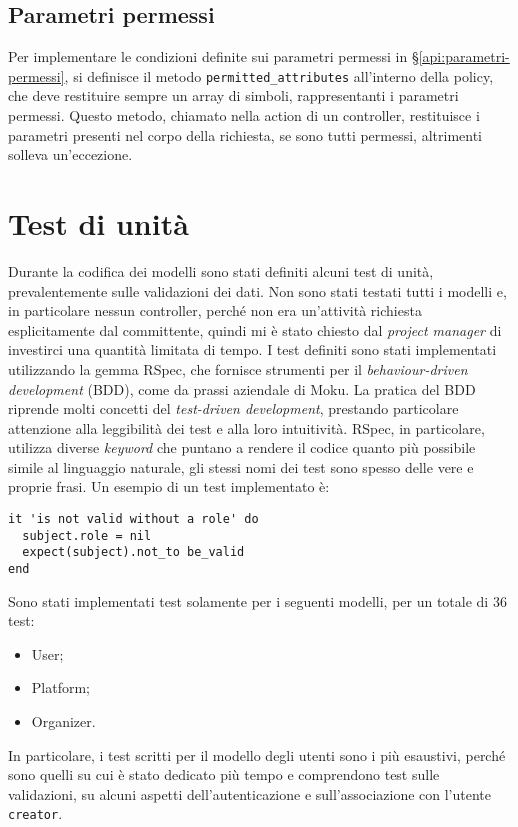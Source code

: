 \subsection{Parametri permessi}
Per implementare le condizioni definite sui parametri permessi in \S \ref{api:parametri-permessi}, si definisce il metodo \verb|permitted_attributes| all'interno della policy, che deve restituire sempre un array di simboli, rappresentanti i parametri permessi. Questo metodo, chiamato nella action di un controller, restituisce i parametri presenti nel corpo della richiesta, se sono tutti permessi, altrimenti solleva un'eccezione.


\section{Test di unità} \label{code:spec}
Durante la codifica dei modelli sono stati definiti alcuni test di unità, prevalentemente sulle validazioni dei dati. Non sono stati testati tutti i modelli e, in particolare nessun controller, perché non era un'attività richiesta esplicitamente dal committente, quindi mi è stato chiesto dal \emph{project manager} di investirci una quantità limitata di tempo. I test definiti sono stati implementati utilizzando la gemma RSpec, che fornisce strumenti per il \emph{behaviour-driven development} (BDD), come da prassi aziendale di Moku. La pratica del BDD riprende molti concetti del \emph{test-driven development}, prestando particolare attenzione alla leggibilità dei test e alla loro intuitività. RSpec, in particolare, utilizza diverse \emph{keyword} che puntano a rendere il codice quanto più possibile simile al linguaggio naturale, gli stessi nomi dei test sono spesso delle vere e proprie frasi.
Un esempio di un test implementato è:
\begin{verbatim}
it 'is not valid without a role' do
  subject.role = nil
  expect(subject).not_to be_valid
end
\end{verbatim}

\noindent Sono stati implementati test solamente per i seguenti modelli, per un totale di 36 test:
\begin{itemize}
	\item User;
	\item Platform;
	\item Organizer.
\end{itemize}
In particolare, i test scritti per il modello degli utenti sono i più esaustivi, perché sono quelli su cui è stato dedicato più tempo e comprendono test sulle validazioni, su alcuni aspetti dell'autenticazione e sull'associazione con l'utente \verb|creator|.
